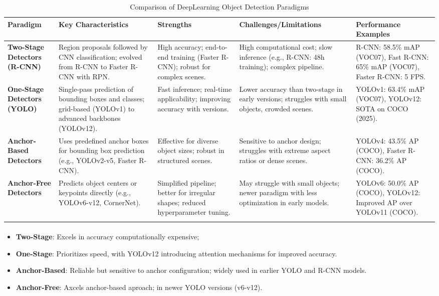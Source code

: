\documentclass[12pt, a4paper]{article}
\begin{document}
\begin{table}[]
\centering
\caption{Comparison of DeepLearning Object Detection Paradigms}
\begin{tabular}{|>{\raggedright\arraybackslash}m{2.5cm}|>{\raggedright\arraybackslash}m{4cm}|>{\raggedright\arraybackslash}m{3.5cm}|>{\raggedright\arraybackslash}m{4.5cm}|>{\raggedright\arraybackslash}m{3cm}|}
\hline
\textbf{Paradigm} & \textbf{Key Characteristics} & \textbf{Strengths} & \textbf{Challenges/Limitations} & \textbf{Performance Examples} \\
\hline
\textbf{Two-Stage Detectors (R-CNN)} & Region proposals followed by CNN classification; evolved from R-CNN to Faster R-CNN with RPN. & High accuracy; end-to-end training (Faster R-CNN); robust for complex scenes. & High computational cost; slow inference (e.g., R-CNN: 48h training); complex pipeline. & R-CNN: 58.5\% mAP (VOC07), Fast R-CNN: 65\% mAP (VOC07), Faster R-CNN: 5 FPS. \\
\hline
\textbf{One-Stage Detectors (YOLO)} & Single-pass prediction of bounding boxes and classes; grid-based (YOLOv1) to advanced backbones (YOLOv12). & Fast inference; real-time applicability; improving accuracy with versions. & Lower accuracy than two-stage in early versions; struggles with small objects, crowded scenes. & YOLOv1: 63.4\% mAP (VOC07), YOLOv12: SOTA on COCO (2025). \\
\hline
\textbf{Anchor-Based Detectors} & Uses predefined anchor boxes for bounding box prediction (e.g., YOLOv2-v5, Faster R-CNN). & Effective for diverse object sizes; robust in structured scenes. & Sensitive to anchor design; struggles with extreme aspect ratios or dense scenes. & YOLOv4: 43.5\% AP (COCO), Faster R-CNN: 36.2\% AP (COCO). \\
\hline
\textbf{Anchor-Free Detectors} & Predicts object centers or keypoints directly (e.g., YOLOv6-v12, CornerNet). & Simplified pipeline; better for irregular shapes; reduced hyperparameter tuning. & May struggle with small objects; newer paradigm with less optimization in early models. & YOLOv6: 50.0\% AP (COCO), YOLOv12: Improved AP over YOLOv11 (COCO). \\
\hline
\label{detectionModelTable}
\end{tabular}
\end{table}

\paragraph{}
\begin{itemize}
    \item \textbf{Two-Stage}: Excels in accuracy computationally expensive;
    \item \textbf{One-Stage}: Prioritizes speed, with YOLOv12 introducing attention mechanisms for improved accuracy.
    \item \textbf{Anchor-Based}: Reliable but sensitive to anchor configuration; widely used in earlier YOLO and R-CNN models.
    \item \textbf{Anchor-Free}: Axcels anchor-based aproach; in newer YOLO versions (v6-v12).
\end{itemize}
\end{document}
